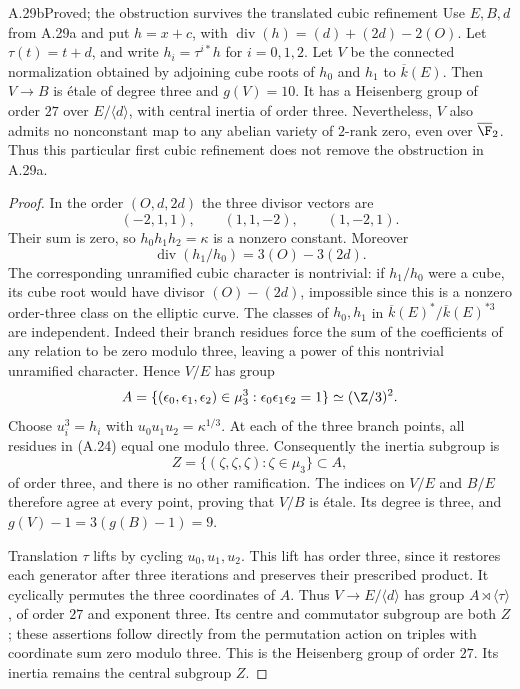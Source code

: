 \begin{claim}{A.29b}{Proved; the obstruction survives the translated cubic refinement}
Use $E,B,d$ from A.29a and put $h=x+c$, with
$\operatorname{div}(h)=(d)+(2d)-2(O)$. Let
$\tau(t)=t+d$, and write $h_i=\tau^{i*}h$ for $i=0,1,2$.
Let $V$ be the connected normalization obtained by adjoining
cube roots of $h_0$ and $h_1$ to $\overline k(E)$.
Then $V\to B$ is \'etale of degree three and $g(V)=10$.
It has a Heisenberg group of order $27$ over $E/\langle d\rangle$,
with central inertia of order three. Nevertheless, $V$ also
admits no nonconstant map to any abelian variety of $2$-rank
zero, even over $\overline{\F}_2$. Thus this particular first
cubic refinement does not remove the obstruction in A.29a.
\end{claim}
\begin{proof}
In the order $(O,d,2d)$ the three divisor vectors are
\[
 (-2,1,1),\qquad(1,1,-2),\qquad(1,-2,1).                  \tag{A.24}
\]
Their sum is zero, so $h_0h_1h_2=\kappa$ is a nonzero
constant. Moreover
\[
 \operatorname{div}(h_1/h_0)=3(O)-3(2d).
\]
The corresponding unramified cubic character is nontrivial:
if $h_1/h_0$ were a cube, its cube root would have divisor
$(O)-(2d)$, impossible since this is a nonzero order-three
class on the elliptic curve. The classes of $h_0,h_1$ in
$\overline k(E)^*/\overline k(E)^{*3}$ are independent.
Indeed their branch residues force the sum of the coefficients
of any relation to be zero modulo three, leaving a power of
this nontrivial unramified character. Hence $V/E$ has group
\[
 A=\{(\epsilon_0,\epsilon_1,\epsilon_2)\in\mu_3^3:
                            \epsilon_0\epsilon_1\epsilon_2=1\}
                    \simeq(\Z/3)^2.
\]
Choose $u_i^3=h_i$ with
$u_0u_1u_2=\kappa^{1/3}$. At each of the three branch
points, all residues in (A.24) equal one modulo three.
Consequently the inertia subgroup is
\[
 Z=\{(\zeta,\zeta,\zeta):\zeta\in\mu_3\}\subset A,
\]
of order three, and there is no other ramification.
The indices on $V/E$ and $B/E$ therefore agree at every
point, proving that $V/B$ is \'etale. Its degree is three,
and $g(V)-1=3(g(B)-1)=9$.

Translation $\tau$ lifts by cycling $u_0,u_1,u_2$. This
lift has order three, since it restores each generator after
three iterations and preserves their prescribed product.
It cyclically permutes the three coordinates of $A$.
Thus $V\to E/\langle d\rangle$ has group
$A\rtimes\langle\tau\rangle$, of order $27$ and exponent
three. Its centre and commutator subgroup are both $Z$;
these assertions follow directly from the permutation action
on triples with coordinate sum zero modulo three. This is
the Heisenberg group of order $27$. Its inertia remains the
central subgroup $Z$.


\end{proof}
